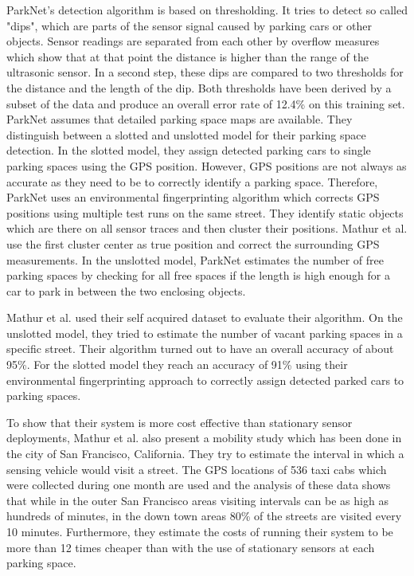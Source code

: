 ParkNet's detection algorithm is based on thresholding. It tries to detect so called "dips", which are parts of the sensor signal caused by parking cars or other objects. Sensor readings are separated from each other by overflow measures which show that at that point the distance is higher than the range of the ultrasonic sensor. In a second step, these dips are compared to two thresholds for the distance and the length of the dip. Both thresholds have been derived by a subset of the data and produce an overall error rate of 12.4\% on this training set. ParkNet assumes that detailed parking space maps are available. They distinguish between a slotted and unslotted model for their parking space detection. In the slotted model, they assign detected parking cars to single parking spaces using the GPS position. However, GPS positions are not always as accurate as they need to be to correctly identify a parking space. Therefore, ParkNet uses an environmental fingerprinting algorithm which corrects GPS positions using multiple test runs on the same street. They identify static objects which are there on all sensor traces and then cluster their positions. Mathur et al. use the first cluster center as true position and correct the surrounding GPS measurements. In the unslotted model, ParkNet estimates the number of free parking spaces by checking for all free spaces if the length is high enough for a car to park in between the two enclosing objects.

Mathur et al. used their self acquired dataset to evaluate their algorithm. On the unslotted model, they tried to estimate the number of vacant parking spaces in a specific street. Their algorithm turned out to have an overall accuracy of about 95\%. For the slotted model they reach an accuracy of 91\% using their environmental fingerprinting approach to correctly assign detected parked cars to parking spaces.

To show that their system is more cost effective than stationary sensor deployments, Mathur et al. also present a mobility study which has been done in the city of San Francisco, California. They try to estimate the interval in which a sensing vehicle would visit a street. The GPS locations of 536 taxi cabs which were collected during one month are used and the analysis of these data shows that while in the outer San Francisco areas visiting intervals can be as high as hundreds of minutes, in the down town areas 80\% of the streets are visited every 10 minutes. Furthermore, they estimate the costs of running their system to be more than 12 times cheaper than with the use of stationary sensors at each parking space.



